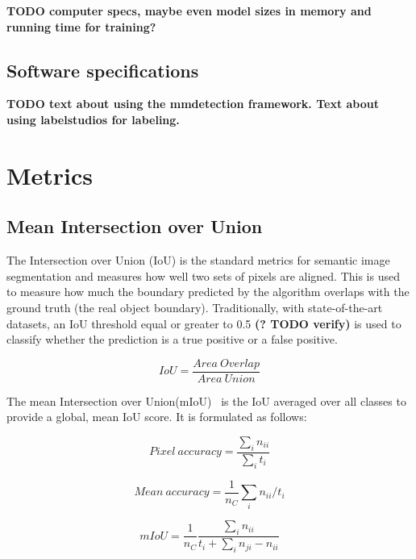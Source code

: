 \documentclass[english, bibtex]{kththesis}
\begin{document}
\textbf{TODO computer specs, maybe even model sizes in memory and running time for training?}

\subsection{Software specifications}

\textbf{TODO text about using the mmdetection framework. Text about using labelstudios for labeling.}

\section{Metrics}

\subsection{Mean Intersection over Union}

The Intersection over Union (IoU) is the standard metrics for semantic image segmentation and measures how well two sets of pixels are aligned. This is used to measure how much the boundary predicted by the algorithm overlaps with the ground truth (the real object boundary). Traditionally, with state-of-the-art datasets, an IoU threshold equal or greater to 0.5 \textbf{(? TODO verify)} is used to classify whether the prediction is a true positive or a false positive.  

\begin{equation}
	IoU = \frac{Area \: Overlap}{Area \: Union}
  	\label{eqn:iou}
\end{equation}

The mean Intersection over Union(mIoU)~\cite{DBLP:journals/corr/LongSD14} is the IoU averaged over all classes to provide a global, mean IoU score. It is formulated as follows:

\begin{equation}
	Pixel \: accuracy = \frac{\sum_{i} n_{ii}}{\sum_{i}t_i}
  	\label{eqn:pixelacc}
\end{equation}

\begin{equation}
	Mean \: accuracy = \frac{1}{n_C} \sum_{i} n_{ii} / t_i
  	\label{eqn:meanacc}
\end{equation}

\begin{equation}
	mIoU = \frac{1}{n_C} \frac{\sum_{i} n_{ii}}{t_i + \sum_{i} n_{ji} - n_{ii}}
  	\label{eqn:meanIoU}
\end{equation}
\end{document}
